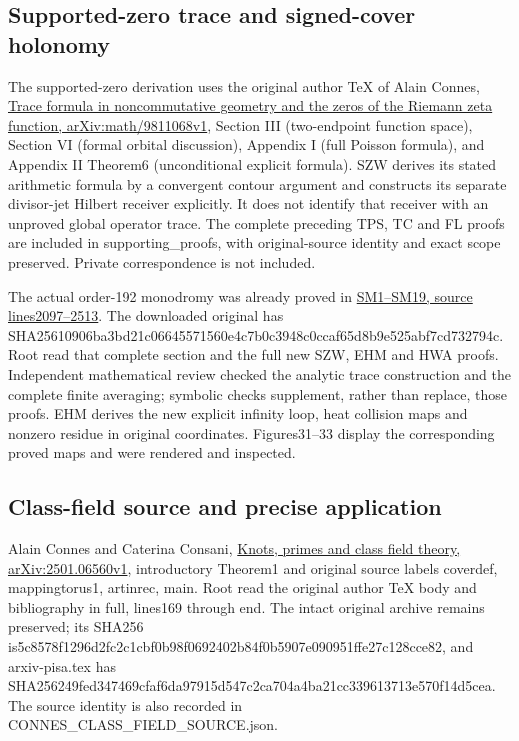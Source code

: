 \documentclass[
  10pt,
  a4paper,
]{article}
\begin{document}
\subsection{Supported-zero trace and signed-cover
holonomy}\label{supported-zero-trace-and-signed-cover-holonomy}

The supported-zero derivation uses the original author TeX of Alain
Connes, \href{https://arxiv.org/abs/math/9811068v1}{Trace formula in
noncommutative geometry and the zeros of the Riemann zeta function,
arXiv:math/9811068v1}, Section III (two-endpoint function space),
Section VI (formal orbital discussion), Appendix I (full Poisson
formula), and Appendix II Theorem6 (unconditional explicit formula). SZW
derives its stated arithmetic formula by a convergent contour argument
and constructs its separate divisor-jet Hilbert receiver explicitly. It
does not identify that receiver with an unproved global operator trace.
The complete preceding TPS, TC and FL proofs are included in
supporting\_proofs, with original-source identity and exact scope
preserved. Private correspondence is not included.

The actual order-192 monodromy was already proved in
\href{https://github.com/KokunoYumeto/zeta-function-research-reader/blob/ab45e221579a0d48ce2885b4ecdf1a6aefc24a20/workbenches/splitzero-tandem/continuations/20260920-fable-boundary-action/FABLE_TO_ORIGINAL_CONDUCTOR.tex\#L2097}{SM1--SM19,
source lines2097--2513}. The downloaded original has
SHA25610906ba3bd21c06645571560e4c7b0c3948c0ccaf65d8b9e525abf7cd732794c.
Root read that complete section and the full new SZW, EHM and HWA
proofs. Independent mathematical review checked the analytic trace
construction and the complete finite averaging; symbolic checks
supplement, rather than replace, those proofs. EHM derives the new
explicit infinity loop, heat collision maps and nonzero residue in
original coordinates. Figures31--33 display the corresponding proved
maps and were rendered and inspected.

\subsection{Class-field source and precise
application}\label{class-field-source-and-precise-application}

Alain Connes and Caterina Consani,
\href{https://arxiv.org/abs/2501.06560v1}{Knots, primes and class field
theory, arXiv:2501.06560v1}, introductory Theorem1 and original source
labels coverdef, mappingtorus1, artinrec, main. Root read the original
author TeX body and bibliography in full, lines169 through end. The
intact original archive remains preserved; its SHA256
is5c8578f1296d2fc2c1cbf0b98f0692402b84f0b5907e090951ffe27c128cce82, and
arxiv-pisa.tex has
SHA256249fed347469cfaf6da97915d547c2ca704a4ba21cc339613713e570f14d5cea.
The source identity is also recorded in
CONNES\_CLASS\_FIELD\_SOURCE.json.
\end{document}
